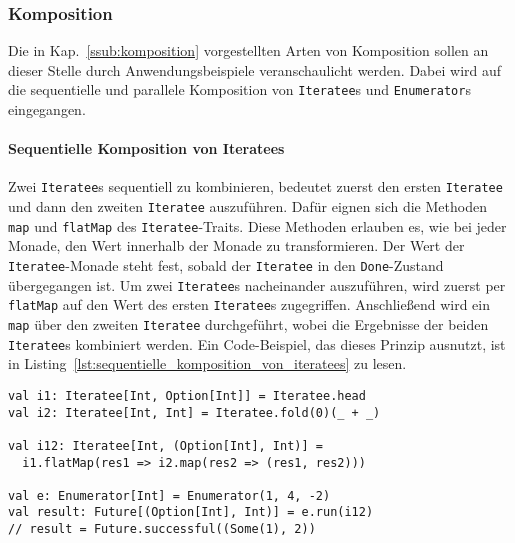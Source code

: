 \documentclass[draft=false
              ,paper=a4
              ,twoside=false
              ,fontsize=11pt
              ,headsepline
              ,BCOR10mm
              ,DIV11
              ]{scrbook}
\begin{document}



\subsubsection{Komposition} %
\label{ssub:anwendung_komposition}

Die in Kap.~\ref{ssub:komposition} vorgestellten Arten von Komposition sollen an dieser Stelle durch Anwendungsbeispiele veranschaulicht werden.
Dabei wird auf die sequentielle und parallele Komposition von \lstinline|Iteratee|s und \lstinline|Enumerator|s eingegangen.

\paragraph{Sequentielle Komposition von Iteratees} %
\label{p:anwendung_sequentielle_komposition_von_iteratees}\mbox{} %

Zwei \lstinline|Iteratee|s sequentiell zu kombinieren, bedeutet zuerst den ersten \lstinline|Iteratee| und dann den zweiten \lstinline|Iteratee| auszuführen.
Dafür eignen sich die Methoden \lstinline|map| und \lstinline|flatMap| des \lstinline|Iteratee|-Traits.
Diese Methoden erlauben es, wie bei jeder Monade, den Wert innerhalb der Monade zu transformieren.
Der Wert der \lstinline|Iteratee|-Monade steht fest, sobald der \lstinline|Iteratee| in den \lstinline|Done|-Zustand übergegangen ist.
Um zwei \lstinline|Iteratee|s nacheinander auszuführen, wird zuerst per \lstinline|flatMap| auf den Wert des ersten \lstinline|Iteratee|s zugegriffen.
Anschließend wird ein \lstinline|map| über den zweiten \lstinline|Iteratee| durchgeführt, wobei die Ergebnisse der beiden \lstinline|Iteratee|s kombiniert werden.
Ein Code-Beispiel, das dieses Prinzip ausnutzt, ist in Listing~\ref{lst:sequentielle_komposition_von_iteratees} zu lesen.

\begin{lstlisting}[caption=Sequentielle Komposition von Iteratees, label=lst:sequentielle_komposition_von_iteratees]
val i1: Iteratee[Int, Option[Int]] = Iteratee.head
val i2: Iteratee[Int, Int] = Iteratee.fold(0)(_ + _)

val i12: Iteratee[Int, (Option[Int], Int)] =
  i1.flatMap(res1 => i2.map(res2 => (res1, res2)))

val e: Enumerator[Int] = Enumerator(1, 4, -2)
val result: Future[(Option[Int], Int)] = e.run(i12)
// result = Future.successful((Some(1), 2))
\end{lstlisting}
\end{document}
